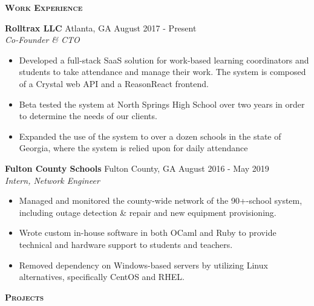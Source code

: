 \documentclass{article}
\newcommand{\sectionHeader}[1]{{\large \textbf{\textsc{#1}}}\hspace{5pt}\xrfill[.5ex]{.4pt}}
\begin{document}
  \vspace{8pt}

  \sectionHeader{Work Experience}

  \vspace{3pt}

  \textbf{Rolltrax LLC} \hspace{3pt} Atlanta, GA \hspace*{\fill} August 2017 - Present\\
  \textit{Co-Founder \& CTO}
  \begin{itemize}
    \item Developed a full-stack SaaS solution for work-based learning coordinators and students to take attendance and manage their work. The system is composed of a Crystal web API and a ReasonReact frontend.
    \item Beta tested the system at North Springs High School over two years in order to determine the needs of our clients.
    \item Expanded the use of the system to over a dozen schools in the state of Georgia, where the system is relied upon for daily attendance
  \end{itemize}

  \vspace{5pt}

  \textbf{Fulton County Schools} \hspace{3pt} Fulton County, GA \hspace*{\fill} August 2016 - May 2019\\
  \textit{Intern, Network Engineer}
  \begin{itemize}
    \item Managed and monitored the county-wide network of the 90+-school system, including outage detection \& repair and new equipment provisioning.
    \item Wrote custom in-house software in both OCaml and Ruby to provide technical and hardware support to students and teachers.
    \item Removed dependency on Windows-based servers by utilizing Linux alternatives, specifically CentOS and RHEL.
  \end{itemize}

  \vspace{8pt}

  \sectionHeader{Projects}

  \vspace{3pt}
\end{document}
